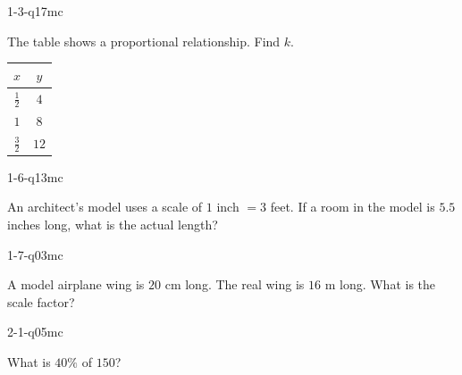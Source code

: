 
\begin{practiceQuestion}{1-3-q17}{mc}
\begin{questionText}
The table shows a proportional relationship. Find $k$.

\begin{center}
\begin{tabular}{|c|c|}
\hline $x$ & $y$ \\ \hline $\frac{1}{2}$ & $4$ \\ $1$ & $8$ \\ $\frac{3}{2}$ & $12$ \\ \hline
\end{tabular}
\end{center}
\end{questionText}
\end{practiceQuestion}

\begin{practiceQuestion}{1-6-q13}{mc}
\begin{questionText}
An architect's model uses a scale of $1$ inch $= 3$ feet. If a room in the model is $5.5$ inches long, what is the actual length?
\end{questionText}
\end{practiceQuestion}

\begin{practiceQuestion}{1-7-q03}{mc}
\begin{questionText}
A model airplane wing is $20$ cm long. The real wing is $16$ m long. What is the scale factor?
\end{questionText}
\end{practiceQuestion}

\begin{practiceQuestion}{2-1-q05}{mc}
\begin{questionText}
What is $40\%$ of $150$?
\end{questionText}
\end{practiceQuestion}

